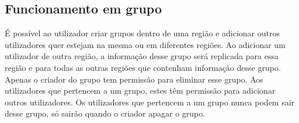 \subsection{Funcionamento em grupo}
É possível ao utilizador criar grupos dentro de uma região e adicionar outros utilizadores quer estejam na mesma ou em diferentes regiões. Ao adicionar um utilizador de outra região, a informação desse grupo será replicada para essa região e para todas as outras regiões que contenham informação desse grupo. Apenas o criador do grupo tem permissão para eliminar esse grupo. Aos utilizadores que pertencem a um grupo, estes têm permissão para adicionar outros utilizadores. Os utilizadores que pertencem a um grupo nunca podem sair desse grupo, só sairão quando o criador apagar o grupo.